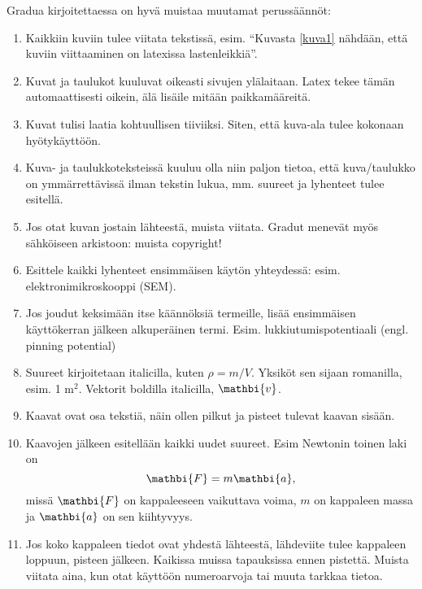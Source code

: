 \documentclass{wihuri}
\begin{document}
\vspace{10cm}











\iffalse 

Gradua kirjoitettaessa on hyvä muistaa muutamat perussäännöt:
\begin{enumerate}
\item Kaikkiin
kuviin tulee viitata tekstissä, esim. ``Kuvasta \ref{kuva1} nähdään,
että kuviin viittaaminen on latexissa lastenleikkiä''.
\item Kuvat ja taulukot kuuluvat oikeasti sivujen ylälaitaan. Latex
  tekee tämän automaattisesti oikein, älä lisäile mitään paikkamääreitä.
\item Kuvat tulisi laatia kohtuullisen tiiviiksi. Siten, että kuva-ala
  tulee kokonaan hyötykäyttöön.
\item Kuva- ja taulukkoteksteissä kuuluu olla niin paljon tietoa, että
  kuva/taulukko on ymmärrettävissä ilman tekstin lukua, mm. suureet ja
  lyhenteet tulee esitellä.
\item Jos otat kuvan jostain lähteestä, muista viitata. Gradut menevät
  myös sähköiseen arkistoon: muista copyright!
\item Esittele kaikki lyhenteet ensimmäisen käytön yhteydessä:
  esim. elektronimikroskooppi (SEM).
\item Jos joudut keksimään itse käännöksiä termeille, lisää
  ensimmäisen käyttökerran jälkeen alkuperäinen
  termi. Esim. lukkiutumispotentiaali (engl. pinning potential)
\item Suureet kirjoitetaan italicilla, kuten $\rho = m/V$. Yksiköt sen
  sijaan romanilla, esim. 1 m$^2$. Vektorit boldilla italicilla,
  $\mathbi{v}$.
\item Kaavat ovat osa tekstiä, näin ollen pilkut ja pisteet tulevat
  kaavan sisään.
\item Kaavojen jälkeen esitellään kaikki uudet suureet. Esim Newtonin
  toinen laki on 
\begin{equation}
\mathbi{F} = m\mathbi{a},
\end{equation}
missä $\mathbi{F}$ on kappaleeseen vaikuttava voima, $m$ on kappaleen
massa ja $\mathbi{a}$ on sen kiihtyvyys.
\item Jos koko kappaleen tiedot ovat yhdestä lähteestä, lähdeviite
  tulee kappaleen loppuun, pisteen jälkeen. Kaikissa muissa
  tapauksissa ennen pistettä. Muista viitata aina, kun otat käyttöön 
  numeroarvoja tai muuta tarkkaa tietoa.
\end{enumerate}
\end{document}
